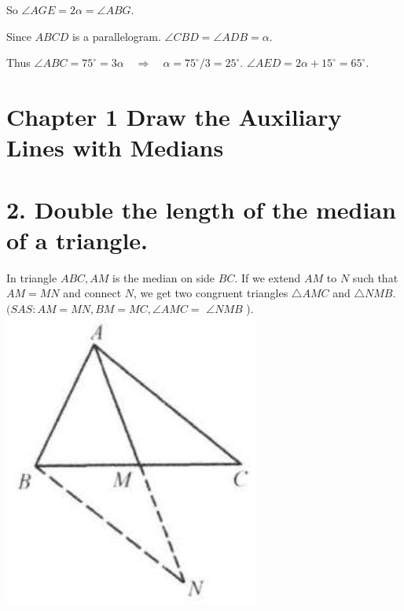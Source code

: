 \documentclass[10pt]{article}
\begin{document}
So \(\angle A G E=2 \alpha=\angle A B G\).

Since \(A B C D\) is a parallelogram. \(\angle C B D=\angle A D B=\alpha\).

Thus \(\angle A B C=75^{\circ}=3 \alpha \quad \Rightarrow \quad \alpha=75^{\circ} / 3=25^{\circ}\). \(\angle A E D=2 \alpha+15^{\circ}=65^{\circ}\).

\section*{Chapter 1 Draw the Auxiliary Lines with Medians}
\section*{2. Double the length of the median of a triangle.}
In triangle \(A B C, A M\) is the median on side \(B C\). If we extend \(A M\) to \(N\) such that \(A M=M N\) and connect \(N\), we get two congruent triangles \(\triangle A M C\) and \(\triangle N M B\). \((S A S: A M=M N, B M=M C, \angle A M C=\) \(\angle N M B\) ).\\
\includegraphics[max width=\textwidth, center]{2025_04_17_97bc1f7e44d93c271a88g-023}
\end{document}

